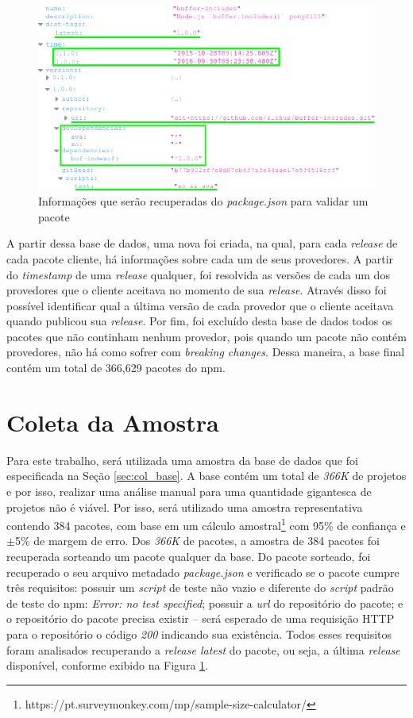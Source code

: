 \begin{figure}
    \centering
    \includegraphics[scale=0.5]{figuras/package_json.png}
    \caption{Informações que serão recuperadas do \textit{package.json} para validar um pacote}
    \label{fig:package_json}
\end{figure}{}

A partir dessa base de dados, uma nova foi criada, na qual, para cada \textit{release} de cada pacote cliente, há informações sobre cada um de seus provedores. A partir do \textit{timestamp} de uma \textit{release} qualquer, foi resolvida as versões de cada um dos provedores que o cliente aceitava no momento de sua \textit{release}. Através disso foi possível identificar qual a última versão de cada provedor que o cliente aceitava quando publicou sua \textit{release}. Por fim, foi excluído desta base de dados todos os pacotes que não continham nenhum provedor, pois quando um pacote não contém provedores, não há como sofrer com \textit{breaking changes}. Dessa maneira, a base final contém um total de 366,629 pacotes do \gls{npm}.

\section{Coleta da Amostra}
\label{sec:col_amostra}
Para este trabalho, será utilizada uma amostra da base de dados que foi especificada na Seção \ref{sec:col_base}. A base contém um total de \textit{366K} de projetos e por isso, realizar uma análise manual para uma quantidade gigantesca de projetos não é viável. Por isso, será utilizado uma amostra representativa contendo 384 pacotes, com base em um cálculo amostral\footnote{https://pt.surveymonkey.com/mp/sample-size-calculator/} com 95\% de confiança e $\pm$5\% de margem de erro. Dos \textit{366K} de pacotes, a amostra de 384 pacotes foi recuperada sorteando um pacote qualquer da base. Do pacote sorteado, foi recuperado o seu arquivo metadado \textit{package.json} e verificado se o pacote cumpre três requisitos: possuir um \textit{script} de teste não vazio e diferente do \textit{script} padrão de teste do \gls{npm}: \textit{Error: no test specified}; possuir a \textit{url} do repositório do pacote; e o repositório do pacote precisa existir -- será esperado de uma requisição \Gls{HTTP} para o repositório o código \textit{200} indicando sua existência. Todos esses requisitos foram analisados recuperando a \textit{release latest} do pacote, ou seja, a última \textit{release} disponível, conforme exibido na Figura \ref{fig:package_json}.

